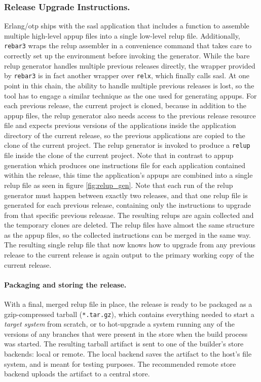 {\subsubsection{Release Upgrade Instructions.} Erlang/\acrshort{otp} ships with the \acrfull{sasl} application that includes a function to assemble multiple high-level \acrfull{appup} files into a single low-level \acrfull{relup} file. Additionally, \lstinline|rebar3| wraps the \acrshort{relup} assembler in a convenience command that takes care to correctly set up the environment before invoking the generator. While the bare \acrshort{relup} generator handles multiple previous releases directly, the wrapper provided by \lstinline|rebar3| is in fact another wrapper over \lstinline|relx|, which finally calls \acrshort{sasl}. At one point in this chain, the ability to handle multiple previous releases is lost, so the tool has to engage a similar technique as the one used for generating \acrshort{appup}s. For each previous release, the current project is cloned, because in addition to the \acrshort{appup} files, the \acrshort{relup} generator also needs access to the previous release resource file and expects previous versions of the applications inside the application directory of the current release, so the previous applications are copied to the clone of the current project. The \acrshort{relup} generator is invoked to produce a \lstinline|relup| file inside the clone of the current project. Note that in contrast to \acrshort{appup} generation which produces one instructions file for each application contained within the release, this time the application's \acrshort{appup}s are combined into a single \acrshort{relup} file as seen in figure \ref{fig:relup_gen}. Note that each run of the \acrshort{relup} generator must happen between exactly two releases, and that one \acrshort{relup} file is generated for each previous release, containing only the instructions to upgrade from that specific previous releasae. The resulting \acrshort{relup}s are again collected and the temporary clones are deleted. The \acrshort{relup} files have almost the same structure as the \acrshort{appup} files, so the collected instructions can be merged in the same way. The resulting single \acrshort{relup} file that now knows how to upgrade from any previous release to the current release is again output to the primary working copy of the current release.

\paragraph{Packaging and storing the release.} With a final, merged \acrfull{relup} file in place, the release is ready to be packaged as a gzip-compressed tarball (\lstinline|*.tar.gz|), which contains everything needed to start a \emph{target system} from scratch, or to hot-upgrade a system running any of the versions of any branches that were present in the store when the build process was started. The resulting tarball artifact is sent to one of the builder's store backends: local or remote. The local backend saves the artifact to the host's file system, and is meant for testing purposes. The recommended remote store backend uploads the artifact to a central store.

}
